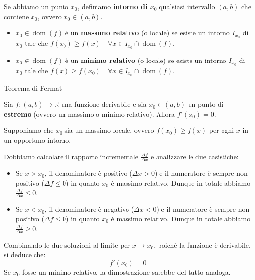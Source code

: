\documentclass[12pt]{report}
\newcommand{\R}{\mathbb{R}}
\begin{document}
	Se abbiamo un punto $x_0$, definiamo \textbf{intorno di $x_0$} qualsiasi intervallo $(a, b)$ che contiene $x_0$, ovvero $x_0 \in (a, b)$.
	
	\begin{itemize}
		
		\item $x_0 \in \operatorname{dom}(f)$ è un \textbf{massimo relativo} (o locale) se esiste un intorno $I_{x_0}$ di $x_0$ tale che $f(x_0) \geq f(x) \quad \forall x \in I_{x_0} \cap \operatorname{dom}(f)$.
		
		\item $x_0 \in \operatorname{dom}(f)$ è un \textbf{minimo relativo} (o locale) se esiste un intorno $I_{x_0}$ di $x_0$ tale che $f(x) \geq f(x_0) \quad \forall x \in I_{x_0} \cap \operatorname{dom}(f)$.
		
	\end{itemize}
	
	\begin{teorema}{Teorema di Fermat}{}
		
		Sia $f: (a, b) \to \R$ una funzione derivabile e sia $x_0 \in (a, b)$ un punto di \textbf{estremo} (ovvero un massimo o minimo relativo).
		Allora $f'(x_0) = 0$.
		
	\end{teorema}
	
	\begin{dimostrazione}{}{}
		
		Supponiamo che $x_0$ sia un massimo locale, ovvero $f(x_0) \geq f(x)$ per ogni $x$ in un opportuno intorno.
		
		Dobbiamo calcolare il rapporto incrementale $\frac{\Delta f}{\Delta x}$ e analizzare le due casistiche:
		
		\begin{itemize}
			
			\item Se $x > x_0$, il denominatore è positivo ($\Delta x > 0$) e il numeratore è sempre non positivo ($\Delta f \leq 0$) in quanto $x_0$ è massimo relativo. Dunque in totale abbiamo $\frac{\Delta f}{\Delta x} \leq 0$.
			
			\item Se $x < x_0$, il denominatore è negativo ($\Delta x < 0$) e il numeratore è sempre non positivo ($\Delta f \leq 0$) in quanto $x_0$ è massimo relativo. Dunque in totale abbiamo $\frac{\Delta f}{\Delta x} \geq 0$.
			
		\end{itemize}
		Combinando le due soluzioni al limite per $x \to x_0$, poichè la funzione è derivabile, si deduce che:
		\[
		f'(x_0) = 0
		\]
		Se $x_0$ fosse un minimo relativo, la dimostrazione sarebbe del tutto analoga.
		
	\end{dimostrazione}
	
\end{document}
